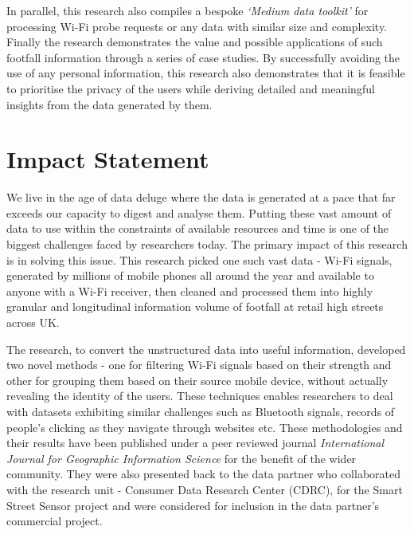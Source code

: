 In parallel, this research also compiles a bespoke \textit{`Medium data toolkit'} for processing Wi-Fi probe requests or any data with similar size and complexity.
Finally the research demonstrates the value and possible applications of such footfall information through a series of case studies.
By successfully avoiding the use of any personal information, this research also demonstrates that it is feasible to prioritise the privacy of the users while deriving detailed and meaningful insights from the data generated by them.

\pagebreak

\section*{Impact Statement}

We live in the age of data deluge where the data is generated at a pace that far exceeds our capacity to digest and analyse them.
Putting these vast amount of data to use within the constraints of available resources and time is one of the biggest challenges faced by researchers today.
The primary impact of this research is in solving this issue.
This research picked one such vast data - Wi-Fi signals, generated by millions of mobile phones all around the year and available to anyone with a Wi-Fi receiver, then cleaned and processed them into highly granular and longitudinal information volume of footfall at retail high streets across UK.

The research, to convert the unstructured data into useful information, developed two novel methods - one for filtering Wi-Fi signals based on their strength and other for grouping them based on their source mobile device, without actually revealing the identity of the users.
These techniques enables researchers to deal with datasets exhibiting similar challenges such as Bluetooth signals, records of people's clicking as they navigate through websites etc.
These methodologies and their results have been published under a peer reviewed journal \textit{International Journal for Geographic Information Science} for the benefit of the wider community.
They were also presented back to the data partner who collaborated with the research unit - Consumer Data Research Center (CDRC), for the Smart Street Sensor project and were considered for inclusion in the data partner's commercial project.

